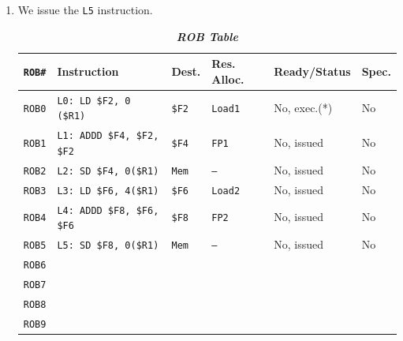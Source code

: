 \begin{enumerate}
    \item We issue the \texttt{L5} instruction.
    \begin{table}[!htp]
        \centering
        \begin{adjustbox}{width={\textwidth},totalheight={\textheight},keepaspectratio}
            \begin{tabular}{@{} l l l l l l @{}}
                \toprule
                \texttt{ROB\#}  & \textbf{Instruction} & \textbf{Dest.} & \textbf{Res. Alloc.} & \textbf{Ready/Status} & \textbf{Spec.} \\
                \midrule
                \texttt{ROB0}   & \texttt{L0: LD \$F2, 0 (\$R1)}    & \texttt{\$F2} & \texttt{Load1}    & No, exec.(*)  & No    \\ [.3em]
                \texttt{ROB1}   & \texttt{L1: ADDD \$F4, \$F2, \$F2}& \texttt{\$F4} & \texttt{FP1}      & No, issued    & No    \\ [.3em]
                \texttt{ROB2}   & \texttt{L2: SD \$F4, 0(\$R1)}     & \texttt{Mem}  & \texttt{--}       & No, issued    & No    \\ [.3em]
                \texttt{ROB3}   & \texttt{L3: LD \$F6, 4(\$R1)}     & \texttt{\$F6} & \texttt{Load2}    & No, issued    & No    \\ [.3em]
                \texttt{ROB4}   & \texttt{L4: ADDD \$F8, \$F6, \$F6}& \texttt{\$F8} & \texttt{FP2}      & No, issued    & No    \\ [.3em]
                \texttt{ROB5}   & \texttt{L5: SD \$F8, 0(\$R1)}     & \texttt{Mem}  & \texttt{--}       & No, issued    & No    \\ [.3em]
                \texttt{ROB6}   &                                   &               &                   &               &       \\ [.3em]
                \texttt{ROB7}   &                                   &               &                   &               &       \\ [.3em]
                \texttt{ROB8}   &                                   &               &                   &               &       \\ [.3em]
                \texttt{ROB9}   &                                   &               &                   &               &       \\
                \bottomrule
            \end{tabular}
        \end{adjustbox}
        \caption*{\emph{\textbf{ROB Table}}}
    \end{table}



\end{enumerate}
